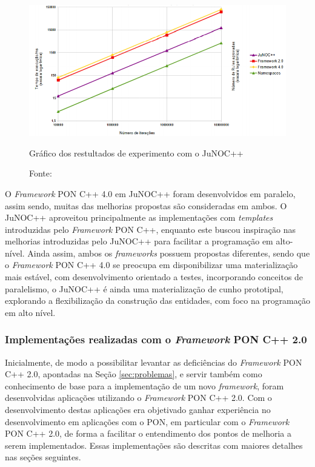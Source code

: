 \begin{figure}[!htb]
  \centering
  \includegraphics[width=.85\textwidth]{../figures/junoc_graph.png}
  \caption{Gráfico dos restultados de experimento com o JuNOC++}
  \caption*{Fonte: }
  \label{fig:exp_junoc}
\end{figure}

O \textit{Framework} PON C++ 4.0 em JuNOC++ foram desenvolvidos em paralelo,
assim sendo, muitas das melhorias propostas são consideradas em ambos. O JuNOC++
aproveitou principalmente as implementações com \textit{templates} introduzidas
pelo \textit{Framework} PON C++, enquanto este buscou inspiração nas melhorias
introduzidas pelo JuNOC++ para facilitar a programação em alto-nível. Ainda
assim, ambos os \textit{frameworks} possuem propostas diferentes, sendo que o
\textit{Framework} PON C++ 4.0 se preocupa em disponibilizar uma materialização
mais estável, com desenvolvimento orientado a testes, incorporando conceitos de
paralelismo, o JuNOC++ é ainda uma materialização de cunho prototipal,
explorando a flexibilização da construção das entidades, com foco na programação
em alto nível.

\subsubsection{Implementações realizadas com o \textit{Framework} PON C++
  2.0}\label{sec:ex_fw2}

Inicialmente, de modo a possibilitar levantar as deficiências do
\textit{Framework} PON C++ 2.0, apontadas na Seção \ref{sec:problemas}, e servir
também como conhecimento de base para a implementação de um novo
\textit{framework}, foram desenvolvidas aplicações utilizando o
\textit{Framework} PON C++ 2.0. Com o desenvolvimento destas aplicações era
objetivado ganhar experiência no desenvolvimento em aplicações com o PON, em
particular com o \textit{Framework} PON C++ 2.0, de forma a facilitar o
entendimento dos pontos de melhoria a serem implementados. Essas implementações
são descritas com maiores detalhes nas seções seguintes.

